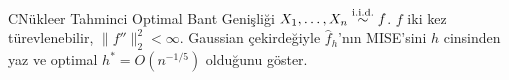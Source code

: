 \begin{alistirma}[Al.17.12]{C}{Nükleer Tahminci Optimal Bant Genişliği}
$X_1,\ldots,X_n\overset{\text{i.i.d.}}{\sim} f$. $f$ iki kez türevlenebilir, $\|f''\|_2^2<\infty$. Gaussian çekirdeğiyle $\hat f_h$'nın MISE'sini $h$ cinsinden yaz ve optimal $h^*=O(n^{-1/5})$ olduğunu göster.
\end{alistirma}
